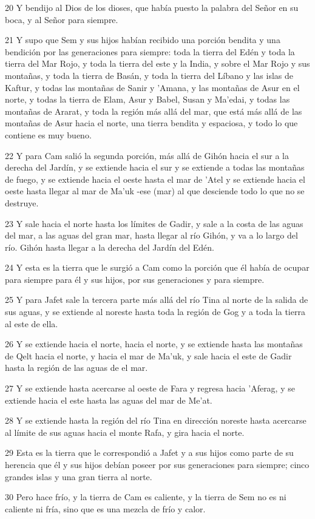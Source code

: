 \par 20 Y bendijo al Dios de los dioses, que había puesto la palabra del Señor en su boca, y al Señor para siempre.
\par 21 Y supo que Sem y sus hijos habían recibido una porción bendita y una bendición por las generaciones para siempre: toda la tierra del Edén y toda la tierra del Mar Rojo, y toda la tierra del este y la India, y sobre el Mar Rojo y sus montañas, y toda la tierra de Basán, y toda la tierra del Líbano y las islas de Kaftur, y todas las montañas de Sanir y 'Amana, y las montañas de Asur en el norte, y todas la tierra de Elam, Asur y Babel, Susan y Ma'edai, y todas las montañas de Ararat, y toda la región más allá del mar, que está más allá de las montañas de Asur hacia el norte, una tierra bendita y espaciosa, y todo lo que contiene es muy bueno.
\par 22 Y para Cam salió la segunda porción, más allá de Gihón hacia el sur a la derecha del Jardín, y se extiende hacia el sur y se extiende a todas las montañas de fuego, y se extiende hacia el oeste hasta el mar de 'Atel y se extiende hacia el oeste hasta llegar al mar de Ma'uk -ese (mar) al que desciende todo lo que no se destruye.
\par 23 Y sale hacia el norte hasta los límites de Gadir, y sale a la costa de las aguas del mar, a las aguas del gran mar, hasta llegar al río Gihón, y va a lo largo del río. Gihón hasta llegar a la derecha del Jardín del Edén.
\par 24 Y esta es la tierra que le surgió a Cam como la porción que él había de ocupar para siempre para él y sus hijos, por sus generaciones y para siempre.
\par 25 Y para Jafet sale la tercera parte más allá del río Tina al norte de la salida de sus aguas, y se extiende al noreste hasta toda la región de Gog y a toda la tierra al este de ella.
\par 26 Y se extiende hacia el norte, hacia el norte, y se extiende hasta las montañas de Qelt hacia el norte, y hacia el mar de Ma'uk, y sale hacia el este de Gadir hasta la región de las aguas de el mar.
\par 27 Y se extiende hasta acercarse al oeste de Fara y regresa hacia 'Aferag, y se extiende hacia el este hasta las aguas del mar de Me'at.
\par 28 Y se extiende hasta la región del río Tina en dirección noreste hasta acercarse al límite de sus aguas hacia el monte Rafa, y gira hacia el norte.
\par 29 Esta es la tierra que le correspondió a Jafet y a sus hijos como parte de su herencia que él y sus hijos debían poseer por sus generaciones para siempre; cinco grandes islas y una gran tierra al norte.
\par 30 Pero hace frío, y la tierra de Cam es caliente, y la tierra de Sem no es ni caliente ni fría, sino que es una mezcla de frío y calor.

